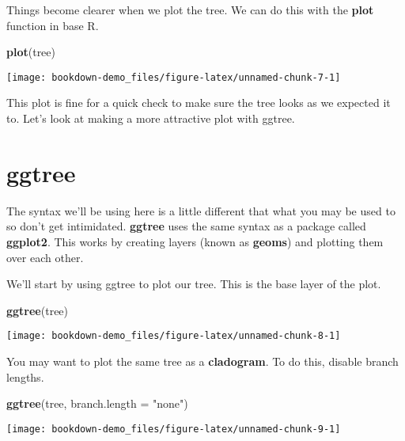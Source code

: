 \documentclass[]{book}
\newenvironment{Shaded}{\begin{snugshade}}{\end{snugshade}}
\newcommand{\KeywordTok}[1]{\textcolor[rgb]{0.13,0.29,0.53}{\textbf{#1}}}
\newcommand{\DataTypeTok}[1]{\textcolor[rgb]{0.13,0.29,0.53}{#1}}
\newcommand{\StringTok}[1]{\textcolor[rgb]{0.31,0.60,0.02}{#1}}
\newcommand{\NormalTok}[1]{#1}
\begin{document}
Things become clearer when we plot the tree. We can do this with the
\textbf{plot} function in base R.

\begin{Shaded}
\begin{Highlighting}[]
\KeywordTok{plot}\NormalTok{(tree)}
\end{Highlighting}
\end{Shaded}

\begin{center}\texttt{[image: bookdown-demo\_files/figure-latex/unnamed-chunk-7-1]} \end{center}

This plot is fine for a quick check to make sure the tree looks as we
expected it to. Let's look at making a more attractive plot with ggtree.

\section{ggtree}\label{ggtree}

The syntax we'll be using here is a little different that what you may
be used to so don't get intimidated. \textbf{ggtree} uses the same
syntax as a package called \textbf{ggplot2}. This works by creating
layers (known as \textbf{geoms}) and plotting them over each other.

We'll start by using ggtree to plot our tree. This is the base layer of
the plot.

\begin{Shaded}
\begin{Highlighting}[]
\KeywordTok{ggtree}\NormalTok{(tree)}
\end{Highlighting}
\end{Shaded}

\begin{center}\texttt{[image: bookdown-demo\_files/figure-latex/unnamed-chunk-8-1]} \end{center}

You may want to plot the same tree as a \textbf{cladogram}. To do this,
disable branch lengths.

\begin{Shaded}
\begin{Highlighting}[]
\KeywordTok{ggtree}\NormalTok{(tree, }\DataTypeTok{branch.length =} \StringTok{"none"}\NormalTok{)}
\end{Highlighting}
\end{Shaded}

\begin{center}\texttt{[image: bookdown-demo\_files/figure-latex/unnamed-chunk-9-1]} \end{center}
\end{document}
